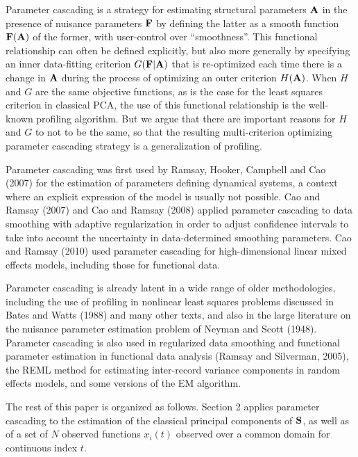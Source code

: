 \documentclass[12pt]{article}
\begin{document}
Parameter cascading is a strategy for estimating structural parameters $\mbox{\bf A}$ in the presence of nuisance parameters $\mbox{\bf F}$ by defining the latter as a smooth function $\mbox{\bf F}(\mbox{\bf A})$ of the former, with user-control over ``smoothness''.  This functional relationship can often be defined explicitly, but also more generally by specifying an inner data-fitting criterion $G(\mbox{\bf F}|\mbox{\bf A})$ that is re-optimized each time there is a change in $\mbox{\bf A}$ during the process of optimizing an outer criterion $H(\mbox{\bf A})$.  When $H$ and $G$ are the same objective functions, as is the case for the least squares criterion in classical PCA, the use of this functional relationship is the well-known profiling algorithm.  But we argue that there are important reasons for $H$ and $G$ to not to be the same, so that the resulting multi-criterion optimizing parameter cascading strategy is a generalization of profiling.

Parameter cascading was first used by Ramsay, Hooker, Campbell and Cao (2007) for the estimation of parameters defining dynamical systems, a context where an explicit expression of the model is usually not possible.  Cao and Ramsay (2007) and Cao and Ramsay (2008) applied parameter cascading to data smoothing with adaptive regularization in order to adjust confidence intervals to take into account the uncertainty in data-determined smoothing parameters. Cao and Ramsay (2010) used parameter cascading for high-dimensional linear mixed effects models, including those for functional data.  

Parameter cascading is already latent in a wide range of older methodologies, including the use of profiling in nonlinear least squares problems discussed in Bates and Watts (1988) and many other texts, and also in the large literature on the nuisance parameter estimation problem of Neyman and Scott (1948). Parameter cascading is also used in regularized data smoothing and functional parameter estimation in functional data analysis (Ramsay and Silverman, 2005), the REML method for estimating inter-record variance components in random effects models, and some versions of the EM algorithm.

The rest of this paper is organized as follows. Section 2 applies parameter cascading to the estimation of the classical principal components of $\mbox{\bf S}$, as well as of a set of $N$ observed functions $x_i(t)$ observed over a common domain for continuous index $t$.

\end{document}
